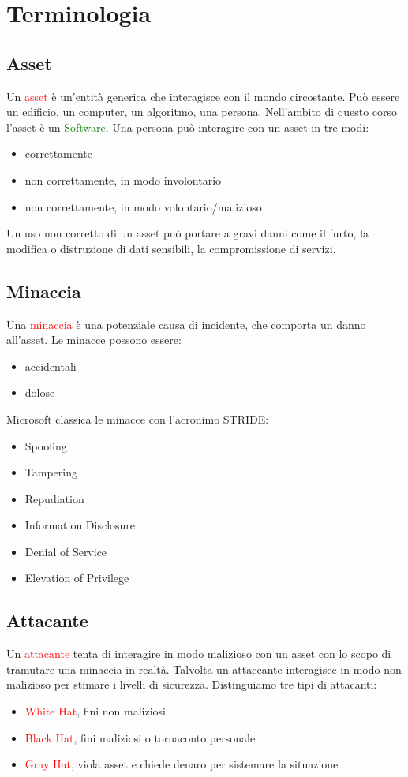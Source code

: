 \chapter{Terminologia}

\section{Asset}
Un \textcolor{red}{asset} è un'entità generica che interagisce con il mondo circostante. Può essere un edificio, un computer, un algoritmo, una persona.
Nell'ambito di questo corso l'asset è un \textcolor{green}{Software}.
Una persona può interagire con un asset in tre modi:
\begin{itemize}
    \item correttamente
    \item non correttamente, in modo involontario
    \item non correttamente, in modo volontario/malizioso
\end{itemize}
Un uso non corretto di un asset può portare a gravi danni come il furto, la modifica o distruzione di dati sensibili, la compromissione di servizi.

\section{Minaccia}
Una \textcolor{red}{minaccia} è una potenziale causa di incidente, che comporta un danno all'asset.
Le minacce possono essere:
\begin{itemize}
    \item accidentali
    \item dolose
\end{itemize}
Microsoft classica le minacce con l'acronimo STRIDE:
\begin{itemize}
    \item Spoofing
    \item Tampering
    \item Repudiation
    \item Information Disclosure
    \item Denial of Service
    \item Elevation of Privilege
\end{itemize}

\section{Attacante}
Un \textcolor{red}{attacante} tenta di interagire in modo malizioso con un asset con lo scopo di tramutare una minaccia in realtà.
Talvolta un attaccante interagisce in modo non malizioso per stimare i livelli di sicurezza.
Distinguiamo tre tipi di attacanti:
\begin{itemize}
    \item \textcolor{red}{White Hat}, fini non maliziosi
    \item \textcolor{red}{Black Hat}, fini maliziosi o tornaconto personale
    \item \textcolor{red}{Gray Hat}, viola asset e chiede denaro per sistemare la situazione
\end{itemize}

